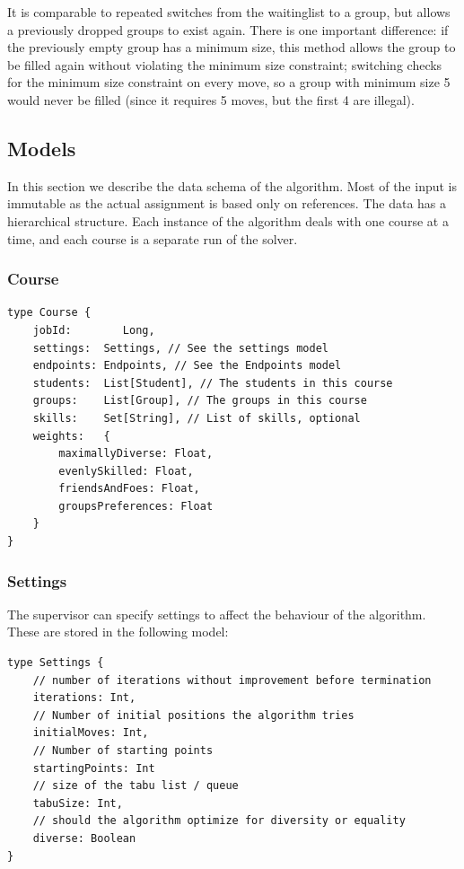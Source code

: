 It is comparable to repeated switches from the waitinglist to a group, but allows a previously dropped groups to exist again. There is one important difference: if the previously empty group has a minimum size, this method allows the group to be filled again without violating the minimum size constraint; switching checks for the minimum size constraint on every move, so a group with minimum size 5 would never be filled (since it requires 5 moves, but the first 4 are illegal).

\subsection{Models}
In this section we describe the data schema of the algorithm. Most of the input is immutable as the actual assignment is based only on references. The data has a hierarchical structure. Each instance of the algorithm deals with one course at a time, and each course is a separate run of the solver.

\subsubsection{Course}
\begin{verbatim}
type Course {
	jobId:        Long,
	settings:  Settings, // See the settings model
	endpoints: Endpoints, // See the Endpoints model
	students:  List[Student], // The students in this course
	groups:    List[Group], // The groups in this course
	skills:    Set[String], // List of skills, optional
	weights:   {
		maximallyDiverse: Float,
		evenlySkilled: Float,
		friendsAndFoes: Float,
		groupsPreferences: Float
	}
}
\end{verbatim}

\subsubsection{Settings}
The supervisor can specify settings to affect the behaviour of the algorithm. These are stored in the following model:
\begin{verbatim}
type Settings {
	// number of iterations without improvement before termination
	iterations: Int,
	// Number of initial positions the algorithm tries
	initialMoves: Int,
	// Number of starting points
	startingPoints: Int
	// size of the tabu list / queue
	tabuSize: Int,
	// should the algorithm optimize for diversity or equality
	diverse: Boolean
}
\end{verbatim}

